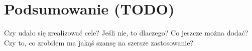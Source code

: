 \chapter{Podsumowanie (TODO)}
Czy udało się zrealizować cele? Jeśli nie, to dlaczego? Co jeszcze można dodać? Czy to, co zrobiłem ma jakąś szansę na szersze zastosowanie?

%
